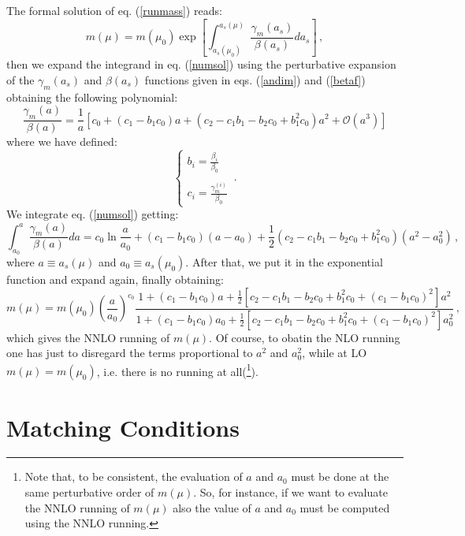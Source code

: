 \documentclass[10pt,a4paper]{article}
\begin{document}
The formal solution of eq. (\ref{runmass}) reads:
\begin{equation}\label{numsol}
m(\mu) = m(\mu_0)\exp\left[\int_{a_s(\mu_0)}^{a_s(\mu)}\frac{\gamma_m(a_s)}{\beta(a_s)}da_s\right]\,,
\end{equation}
then we expand the integrand in eq. (\ref{numsol}) using the perturbative expansion of the $\gamma_m(a_s)$ and $\beta(a_s)$ functions given in eqs. (\ref{andim}) and (\ref{betaf}) obtaining the following polynomial:
\begin{equation}
\frac{\gamma_m(a)}{\beta(a)} = \frac1{a}\left[c_0 + (c_1-b_1c_0)a+(c_2-c_1b_1-b_2c_0+b_1^2c_0)a^2+\mathcal{O}(a^3)\right]
\end{equation}
where we have defined:
\begin{equation}\label{jhgkgfkgf}
\left\{\begin{array}{l}
\displaystyle b_i = \frac{\beta_i}{\beta_0}\\
\\
\displaystyle c_i = \frac{\gamma_m^{(i)}}{\beta_0}
\end{array}\right.\,.
\end{equation}
We integrate eq. (\ref{numsol}) getting:
\begin{equation}\label{integral}
\int_{a_0}^a\frac{\gamma_m(a)}{\beta(a)}da = c_0\ln\frac{a}{a_0} + (c_1-b_1c_0)(a-a_0)+\frac12(c_2-c_1b_1-b_2c_0+b_1^2c_0)(a^2-a_0^2)\,,
\end{equation}
where  $a\equiv a_s(\mu)$ and $a_0\equiv a_s(\mu_0)$. After that, we put it in the exponential function and expand again, finally obtaining:
\begin{equation}\label{ansol}
m(\mu)=m(\mu_0)\left(\frac{a}{a_0}\right)^{c_0}\frac{1+(c_1-b_1c_0)a+\frac12[c_2-c_1b_1-b_2c_0+b_1^2c_0+(c_1-b_1c_0)^2]a^2}{1+(c_1-b_1c_0)a_0+\frac12[c_2-c_1b_1-b_2c_0+b_1^2c_0+(c_1-b_1c_0)^2]a_0^2}\,,
\end{equation}
which gives the NNLO running of $m(\mu)$. Of course, to obatin the NLO running one has just to disregard the terms proportional to $a^2$ and $a_0^2$, while at LO $m(\mu)=m(\mu_0)$, i.e. there is no running at all(\footnote{Note that, to be consistent, the evaluation of $a$ and $a_0$ must be done at the same perturbative order of $m(\mu)$. So, for instance, if we want to evaluate the NNLO running of $m(\mu)$ also the value of $a$ and $a_0$ must be computed using the NNLO running.}).

\section{Matching Conditions}
\end{document}
